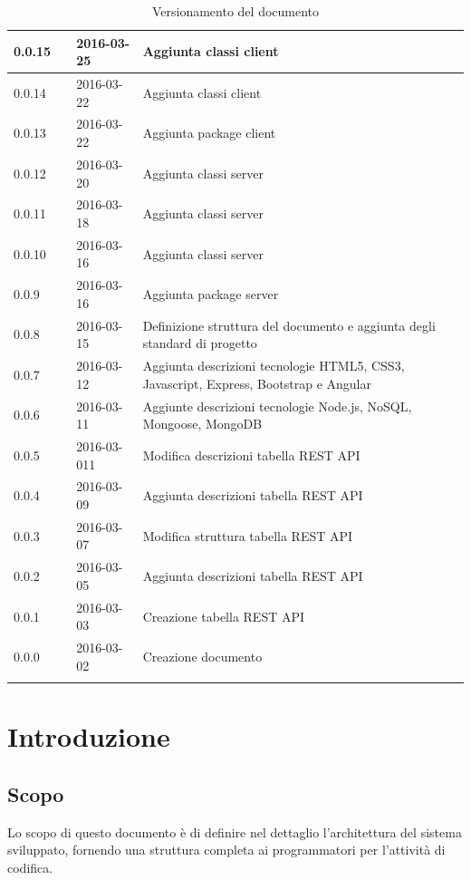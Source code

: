 \documentclass[12pt,a4paper]{article}
\begin{document}
\begin{center}
\begin{longtable}[H]{p{} p{} p{} p{}}
		0.0.15 & \AB{} & 2016-03-25 & Aggiunta classi client \\*
		\midrule
		0.0.14 & \NDC{} & 2016-03-22 & Aggiunta classi client \\*
		\midrule
		0.0.13 & \NDC{} & 2016-03-22 & Aggiunta package client \\*
		\midrule
		0.0.12 & \AVE{} & 2016-03-20 & Aggiunta classi server \\*
		\midrule
		0.0.11 & \AVI{} & 2016-03-18 & Aggiunta classi server \\*
		\midrule
		0.0.10 & \TP{} & 2016-03-16 & Aggiunta classi server \\*
		\midrule
		0.0.9 & \TP{} & 2016-03-16 & Aggiunta package server \\*
        \midrule
        0.0.8 & \NDC{} & 2016-03-15 & Definizione struttura del documento e aggiunta
            degli standard di progetto \\*
		\midrule
		0.0.7 & \AVE{} & 2016-03-12 & Aggiunta descrizioni tecnologie HTML5, CSS3, Javascript, 
            Express, Bootstrap e Angular \\*
		\midrule
		0.0.6 & \AVE{} & 2016-03-11 & Aggiunte descrizioni tecnologie Node.js, NoSQL, Mongoose, MongoDB \\*
		\midrule
		0.0.5 & \AVE{} & 2016-03-011 & Modifica descrizioni tabella REST API \\*
		\midrule
		0.0.4 & \TP{} & 2016-03-09 &  Aggiunta descrizioni tabella REST API \\*
		\midrule
		0.0.3 & \TP{} & 2016-03-07 &  Modifica struttura tabella REST API \\*
		\midrule
		0.0.2 & \AVI{} & 2016-03-05 &  Aggiunta descrizioni tabella REST API \\*
		\midrule
		0.0.1 & \NDC{} & 2016-03-03 &  Creazione tabella REST API \\*
		\midrule
		0.0.0 & \NDC{} & 2016-03-02 &  Creazione documento \\*
		\bottomrule
		\caption{Versionamento del documento}
		\label{tabVers1} 
	\end{longtable}
\end{center}

\newpage
\tableofcontents
\newpage
\listoftables
\listoffigures
\newpage

\section{Introduzione}	\label{intro}
\subsection{Scopo}
Lo scopo di questo documento è di definire nel dettaglio l'architettura del sistema sviluppato, fornendo una struttura completa ai programmatori per l'attività di codifica.
\end{document}
